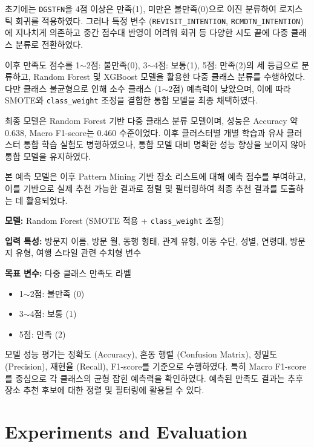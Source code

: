 \documentclass[sigconf]{acmart}
\begin{document}
\begin{CJK}{UTF8}{mj}
초기에는 \texttt{DGSTFN}을 4점 이상은 만족(1), 미만은 불만족(0)으로 이진 분류하여 로지스틱 회귀를 적용하였다.  
그러나 특정 변수 (\texttt{REVISIT\_INTENTION}, \texttt{RCMDTN\_INTENTION})에 지나치게 의존하고 중간 점수대 반영이 어려워 회귀 등 다양한 시도 끝에 다중 클래스 분류로 전환하였다.

이후 만족도 점수를 1$\sim$2점: 불만족(0), 3$\sim$4점: 보통(1), 5점: 만족(2)의 세 등급으로 분류하고, Random Forest 및 XGBoost 모델을 활용한 다중 클래스 분류를 수행하였다.  
다만 클래스 불균형으로 인해 소수 클래스 (1$\sim$2점) 예측력이 낮았으며, 이에 따라 SMOTE와 \texttt{class\_weight} 조정을 결합한 통합 모델을 최종 채택하였다.

최종 모델은 Random Forest 기반 다중 클래스 분류 모델이며, 성능은 Accuracy 약 0.638, Macro F1-score는 0.460 수준이었다.  
이후 클러스터별 개별 학습과 유사 클러스터 통합 학습 실험도 병행하였으나, 통합 모델 대비 명확한 성능 향상을 보이지 않아 통합 모델을 유지하였다.

본 예측 모델은 이후 Pattern Mining 기반 장소 리스트에 대해 예측 점수를 부여하고, 이를 기반으로 실제 추천 가능한 결과로 정렬 및 필터링하여 최종 추천 결과를 도출하는 데 활용되었다.

\vspace{0.5em}
\noindent\textbf{모델:} Random Forest (SMOTE 적용 + \texttt{class\_weight} 조정)

\noindent\textbf{입력 특성:} 방문지 이름, 방문 월, 동행 형태, 관계 유형, 이동 수단, 성별, 연령대, 방문지 유형, 여행 스타일 관련 수치형 변수

\noindent\textbf{목표 변수:} 다중 클래스 만족도 라벨
\begin{itemize}
  \item 1$\sim$2점: 불만족 (0)
  \item 3$\sim$4점: 보통 (1)
  \item 5점: 만족 (2)
\end{itemize}

모델 성능 평가는 정확도 (Accuracy), 혼동 행렬 (Confusion Matrix), 정밀도 (Precision), 재현율 (Recall), F1-score를 기준으로 수행하였다.  
특히 Macro F1-score를 중심으로 각 클래스의 균형 잡힌 예측력을 확인하였다.  
예측된 만족도 결과는 추후 장소 추천 후보에 대한 정렬 및 필터링에 활용될 수 있다.



\section{Experiments and Evaluation}%


\end{CJK}
\end{document}

